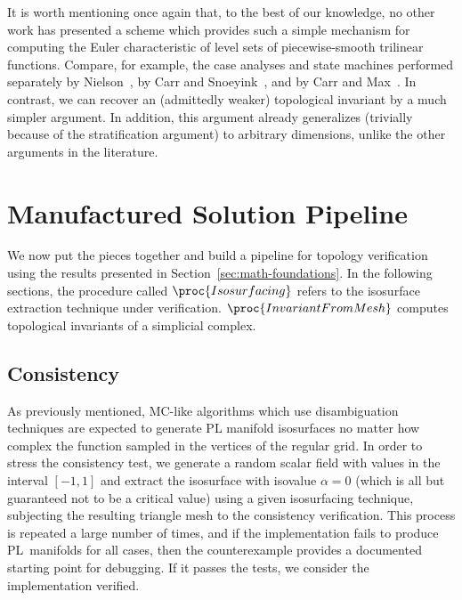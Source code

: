 It is worth mentioning once again that, to the best of our knowledge,
no other work has presented a scheme which provides such a simple
mechanism for computing the Euler characteristic of level sets of
piecewise-smooth trilinear functions. Compare, for example, the case
analyses and state machines performed separately by
Nielson~\cite{Nielson03onmarching}, by Carr and Snoeyink~\cite{CS08},
and by Carr and Max~\cite{10.1109/TVCG.2009.10}. In contrast, we can recover an
(admittedly weaker) topological invariant by a much simpler
argument. In addition, this argument already generalizes (trivially
because of the stratification argument) to arbitrary dimensions,
unlike the other arguments in the literature.


\section{Manufactured Solution Pipeline}
\label{sec:manufactured}

We now put the pieces together and build a pipeline for topology 
verification using the results presented in Section~\ref{sec:math-foundations}. 
In the following sections, the procedure called $\proc{Isosurfacing}$ refers to the
isosurface extraction technique under verification.
$\proc{InvariantFromMesh}$ computes topological invariants of a simplicial
complex. 


\subsection{Consistency}
\label{sec:consistency-verification}

As previously mentioned, MC-like algorithms which use
disambiguation techniques are expected to generate PL manifold isosurfaces no matter how complex 
the function sampled in the vertices of the regular grid. 
In order to stress the consistency test, we generate a random scalar field with values in the
interval $[-1,1]$ and extract the isosurface with isovalue $\alpha=0$
(which is all but guaranteed not to be a critical value) using a
given isosurfacing technique, subjecting the 
resulting triangle mesh to the consistency verification. This process
is repeated a large number of times, and  
%
if the implementation fails to
produce \mbox{PL manifolds} for all cases, then the counterexample
provides a documented starting point for debugging. If it passes the
tests, we consider the implementation verified.

